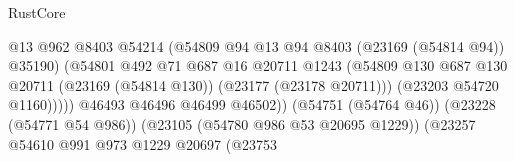 \begin{lexlean}{RustCore}
\begin{coremodule}
                                                          @13
                                                          @962
                                                          @8403
                                                          @54214
                                                          (@54809
                                                            @94
                                                            @13
                                                            @94
                                                            @8403
                                                            (@23169 (@54814 @94))
                                                            @35190)
                                                          (@54801
                                                            @492
                                                            @71
                                                            @687
                                                            @16
                                                            @20711
                                                            @1243
                                                            (@54809
                                                              @130
                                                              @687
                                                              @130
                                                              @20711
                                                              (@23169 (@54814 @130))
                                                              (@23177 (@23178 @20711)))
                                                            (@23203 @54720 @1160)))))
                                                    @46493
                                                    @46496
                                                    @46499
                                                    @46502))
                                                (@54751 (@54764 @46))
                                                (@23228 (@54771 @54 @986))
                                                (@23105 (@54780 @986 @53 @20695 @1229))
                                                (@23257
                                                  @54610
                                                  @991
                                                  @973
                                                  @1229
                                                  @20697
                                                  (@23753

\end{coremodule}
\end{lexlean}
